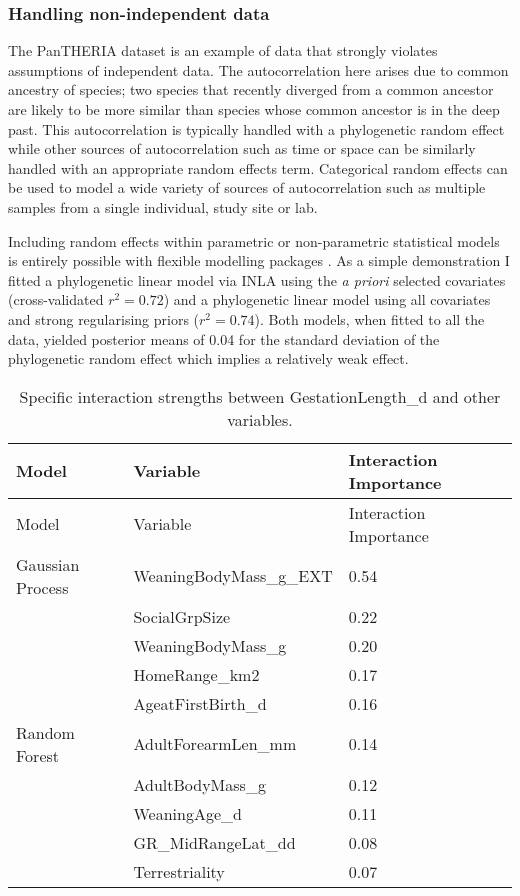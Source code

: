 \documentclass[10pt,]{article}
\begin{document}
\subsubsection{Handling non-independent data}\label{handling-non-independent-data}

The PanTHERIA dataset is an example of data that strongly violates assumptions of independent data. The autocorrelation here arises due to common ancestry of species; two species that recently diverged from a common ancestor are likely to be more similar than species whose common ancestor is in the deep past. This autocorrelation is typically handled with a phylogenetic random effect while other sources of autocorrelation such as time or space can be similarly handled with an appropriate random effects term. Categorical random effects can be used to model a wide variety of sources of autocorrelation such as multiple samples from a single individual, study site or lab.

Including random effects within parametric or non-parametric statistical models is entirely possible with flexible modelling packages \citep{stan, INLA, glmmTMB, tmb}. As a simple demonstration I fitted a phylogenetic linear model via INLA \citep{INLA} using the \emph{a priori} selected covariates (cross-validated \(r^2 = 0.72\)) and a phylogenetic linear model using all covariates and strong regularising priors (\(r^2 = 0.74\)). Both models, when fitted to all the data, yielded posterior means of 0.04 for the standard deviation of the phylogenetic random effect which implies a relatively weak effect.

\begin{table}[t!]
\begin{longtable}[c]{@{}lll@{}}
\caption{Specific interaction strengths between GestationLength\_d and other variables. \label{tbl:specificinter}}\tabularnewline
\toprule
Model & Variable & Interaction Importance\tabularnewline
\midrule
\endfirsthead
\toprule
Model & Variable & Interaction Importance\tabularnewline
\midrule
\endhead
Gaussian Process & WeaningBodyMass\_g\_EXT & 0.54\tabularnewline
& SocialGrpSize & 0.22\tabularnewline
& WeaningBodyMass\_g & 0.20\tabularnewline
& HomeRange\_km2 & 0.17\tabularnewline
& AgeatFirstBirth\_d & 0.16\tabularnewline
Random Forest & AdultForearmLen\_mm & 0.14\tabularnewline
& AdultBodyMass\_g & 0.12\tabularnewline
& WeaningAge\_d & 0.11\tabularnewline
& GR\_MidRangeLat\_dd & 0.08\tabularnewline
& Terrestriality & 0.07\tabularnewline
\bottomrule
\end{longtable}
\end{table}
  
\end{document}
